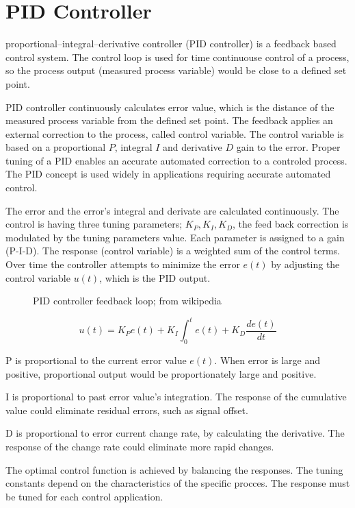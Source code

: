 \documentclass[\main/master.tex]{subfiles}
\begin{document}
\section{PID Controller}
proportional–integral–derivative controller (PID controller) is a feedback based control system. The control loop is used for time continuouse control of a process, so the process output (measured process variable) would be close to a defined set point.
\par
PID controller continuously calculates error value, which is the distance of the measured process variable from the defined set point. The feedback applies an external correction to the process, called control variable. The control variable is based on a proportional $P$, integral $I$ and derivative $D$ gain to the error. Proper tuning of a PID enables an accurate automated correction to a controled process. The PID concept is used widely in applications requiring accurate automated control.

\par
The error and the error's integral and derivate are calculated continuously. The control is having three tuning parameters; $K_P, K_I, K_D$, the feed back correction is modulated by the tuning parameters value. Each parameter is assigned to a gain (P-I-D). The response (control variable) is a weighted sum of the control terms. Over time the controller attempts to minimize the error $e(t)$ by adjusting the control variable $u(t)$, which is the PID output.
\par
\begin{figure}[htbp]
	\centering
	\caption[PID]{PID controller feedback loop; from wikipedia}
	\label{fig:PID_scheme}
\end{figure}
\begin{equation}
u(t) = K_Pe(t)+K_I\int_{0}^{t}e(t)+K_D\frac{de(t)}{dt}   \label{eqn:PID_eq}
\end{equation}


P is proportional to the current error value $e(t)$. When error is large and positive, proportional output would be proportionately large and positive.
\par
I is proportional to past error value's integration. The response of the cumulative value could eliminate residual errors, such as signal offset.
\par
D is proportional to error current change rate, by calculating the derivative. The response of the change rate could eliminate more rapid changes.
\par
The optimal control function is achieved by balancing the responses. The tuning constants depend on the characteristics of the specific procces. The response must be tuned for each control application.  
\end{document}
